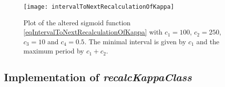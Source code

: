 
\begin{figure}[bhtp]
	\centering
	\texttt{[image: intervalToNextRecalculationOfKappa]}
	\caption{Plot of the altered sigmoid function \eqref{eqIntervalToNextRecalculationOfKappa} with $c_1=100$, $c_2=250$, $c_3=10$ and $c_4=0.5$.
			The minimal interval is given by $c_1$ and the maximum period by $c_1+c_2$.  }
	\label{figIntervalToNextRecalculationOfKappa}
\end{figure}

	\subsection{Implementation of \emph{recalcKappaClass}}

